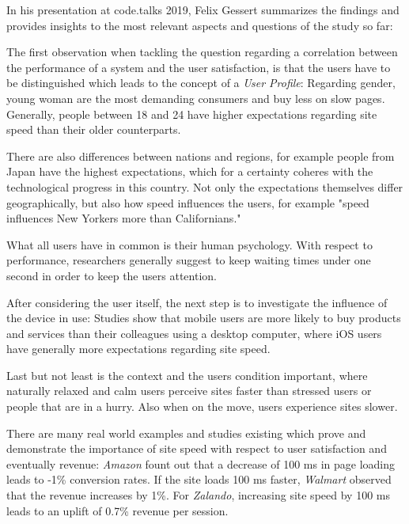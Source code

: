 In his presentation at code.talks 2019, Felix Gessert summarizes the findings and provides insights to the most relevant aspects and questions of the study so far: %

The first observation when tackling the question regarding a correlation between the performance of a system and the user satisfaction, is that the users have to be distinguished which leads to the concept of a \textit{User Profile}: Regarding gender, young woman are the most demanding consumers and buy less on slow pages.
Generally, people between 18 and 24 have higher expectations regarding site speed than their older counterparts.

There are also differences between nations and regions, for example people from Japan have the highest expectations, which for a certainty coheres with the technological progress in this country.
Not only the expectations themselves differ geographically, but also how speed influences the users, for example "speed influences New Yorkers more than Californians."



What all users have in common is their human psychology. With respect to performance, researchers generally suggest to keep waiting times under one second in order to keep the users attention.

After considering the user itself, the next step is to investigate the influence of the device in use: Studies show that mobile users are more likely to buy products and services than their colleagues using a desktop computer, where iOS users have generally more expectations regarding site speed.
 
Last but not least is the context and the users condition important, where naturally relaxed and calm users perceive sites faster than stressed users or people that are in a hurry.
Also when on the move, users experience sites slower.


There are many real world examples and studies existing which prove and demonstrate the importance of site speed with respect to user satisfaction and eventually revenue:
\textit{Amazon} fount out that a decrease of 100 ms in page loading leads to -1\% conversion rates.
If the site loads 100 ms faster, \textit{Walmart} observed that the revenue increases by 1\%.
For \textit{Zalando}, increasing site speed by 100 ms leads to an uplift of 0.7\% revenue per session.

